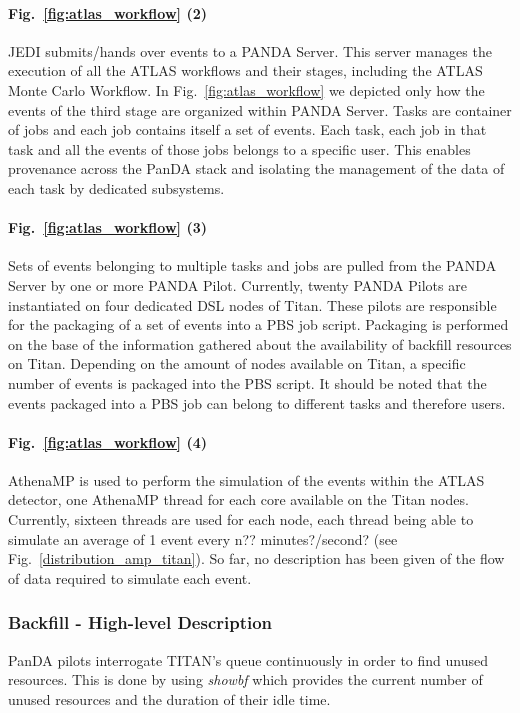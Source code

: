 \paragraph{Fig.~\ref{fig:atlas_workflow} (2)} JEDI submits/hands over events
to a PANDA Server. This server manages the execution of all the ATLAS workflows
and their stages, including the ATLAS Monte Carlo Workflow. In
Fig.~\ref{fig:atlas_workflow} we depicted only how the events of the third
stage are organized within PANDA Server. Tasks are container of jobs and each
job contains itself a set of events. Each task, each job in that task and all
the events of those jobs belongs to a specific user. This enables provenance
across the PanDA stack and isolating the management of the data of each task by
dedicated subsystems.

\paragraph{Fig.~\ref{fig:atlas_workflow} (3)} Sets of events belonging to
multiple tasks and jobs are pulled from the PANDA Server by one or more PANDA
Pilot. Currently, twenty PANDA Pilots are instantiated on four dedicated DSL
nodes of Titan. These pilots are responsible for the packaging of a set of
events into a PBS job script. Packaging is performed on the base of the
information gathered about the availability of backfill resources on Titan.
Depending on the amount of nodes available on Titan, a specific number of events
is packaged into the PBS script. It should be noted that the events packaged
into a PBS job can belong to different tasks and therefore users.

\paragraph{Fig.~\ref{fig:atlas_workflow} (4)} AthenaMP is used to perform the
simulation of the events within the ATLAS detector, one AthenaMP thread for each
core available on the Titan nodes. Currently, sixteen threads are used for each
node, each thread being able to simulate an average of 1 event every n??
minutes?/second? (see Fig.~\ref{distribution_amp_titan}). So far, no
description has been given of the flow of data required to simulate each event.


\subsubsection{Backfill - High-level Description}
PanDA pilots  interrogate TITAN's queue continuously in order to find unused resources. This is done by using \emph{showbf} which provides the current number of unused resources and the duration of their idle time.

